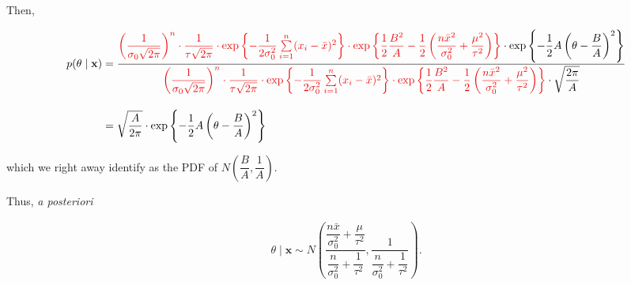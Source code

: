 \documentclass[12pt, a4paper]{article}
\begin{document}
Then,

\begin{align*}
p(\theta \mid \mathbf{x}) &= \dfrac{\textcolor[HTML]{EB0505}{\left(\dfrac{1}{\sigma_0\sqrt{2\pi}}\right)^n \cdot \dfrac{1}{\tau\sqrt{2\pi}} \cdot \exp\left\{ -\dfrac{1}{2\sigma_0^2}\sum\limits_{i=1}^{n}(x_i-\bar{x})^2 \right\} \cdot \exp\left\{ \dfrac{1}{2}\dfrac{B^2}{A} - \dfrac{1}{2}\left(\dfrac{n\bar{x}^2}{\sigma_0^2} + \dfrac{\mu^2}{\tau^2}\right) \right\}} \cdot \exp\left\{ -\dfrac{1}{2}A\left(\theta-\dfrac{B}{A}\right)^2 \right\}}{\textcolor[HTML]{EB0505}{\left(\dfrac{1}{\sigma_0\sqrt{2\pi}}\right)^n \cdot \dfrac{1}{\tau\sqrt{2\pi}} \cdot \exp\left\{ -\dfrac{1}{2\sigma_0^2}\sum\limits_{i=1}^{n}(x_i-\bar{x})^2 \right\} \cdot \exp\left\{ \dfrac{1}{2}\dfrac{B^2}{A} - \dfrac{1}{2}\left(\dfrac{n\bar{x}^2}{\sigma_0^2} + \dfrac{\mu^2}{\tau^2}\right) \right\}} \cdot \sqrt{\dfrac{2\pi}{A}}} \\[1em]
&=
\sqrt{\dfrac{A}{2\pi}} \cdot \exp\left\{ -\dfrac{1}{2}A\left(\theta-\dfrac{B}{A}\right)^2 \right\}
\end{align*}

which we right away identify as the PDF of $N\left( \dfrac{B}{A}, \dfrac{1}{A}\right)$.

\newpage

Thus, \textit{a posteriori}

\begin{align*}
\theta \mid \mathbf{x} \sim N\left( \dfrac{\dfrac{n\bar{x}}{\sigma_0^2} + \dfrac{\mu}{\tau^2}}{\dfrac{n}{\sigma_0^2} + \dfrac{1}{\tau^2}}, \dfrac{1}{\dfrac{n}{\sigma_0^2} + \dfrac{1}{\tau^2}} \right).
\end{align*}
\end{document}
